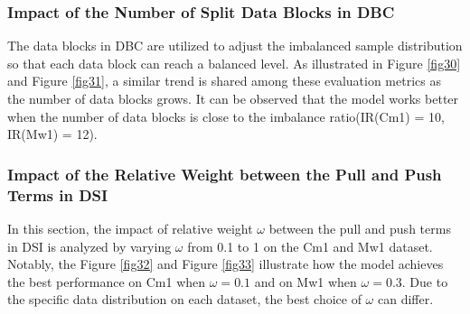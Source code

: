 \subsubsection{Impact of the Number of Split Data Blocks in DBC}
The data blocks in DBC are utilized to adjust the imbalanced sample distribution so that each data block can reach a balanced level. As illustrated in Figure \ref{fig30} and Figure \ref{fig31}, a similar trend is shared among these evaluation metrics as the number of data blocks grows. It can be observed that the model works better when the number of data blocks is close to the imbalance ratio(IR(Cm1) = 10, IR(Mw1) = 12).


\subsubsection{Impact of the Relative Weight between the Pull and Push Terms in DSI}
In this section, the impact of relative weight $\omega$ between the pull and push terms in DSI is analyzed by varying $\omega$ from 0.1 to 1 on the Cm1 and Mw1 dataset. Notably, the Figure \ref{fig32} and Figure \ref{fig33} illustrate how the model achieves the best performance on Cm1 when $\omega=0.1$ and on Mw1 when $\omega=0.3$. Due to the specific data distribution on each dataset, the best choice of $\omega$ can differ.


